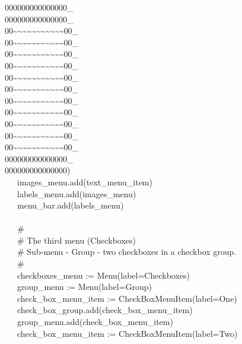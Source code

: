 {000000000000000\_ \\
000000000000000\_ \\
00\~{}\~{}\~{}\~{}\~{}\~{}\~{}\~{}\~{}\~{}\~{}00\_ \\
00\~{}\~{}\~{}\~{}\~{}\~{}\~{}\~{}\~{}\~{}\~{}00\_ \\
00\~{}\~{}\~{}\~{}\~{}\~{}\~{}\~{}\~{}\~{}\~{}00\_ \\
00\~{}\~{}\~{}\~{}\~{}\~{}\~{}\~{}\~{}\~{}\~{}00\_ \\
00\~{}\~{}\~{}\~{}\~{}\~{}\~{}\~{}\~{}\~{}\~{}00\_ \\
00\~{}\~{}\~{}\~{}\~{}\~{}\~{}\~{}\~{}\~{}\~{}00\_ \\
00\~{}\~{}\~{}\~{}\~{}\~{}\~{}\~{}\~{}\~{}\~{}00\_ \\
00\~{}\~{}\~{}\~{}\~{}\~{}\~{}\~{}\~{}\~{}\~{}00\_ \\
00\~{}\~{}\~{}\~{}\~{}\~{}\~{}\~{}\~{}\~{}\~{}00\_ \\
00\~{}\~{}\~{}\~{}\~{}\~{}\~{}\~{}\~{}\~{}\~{}00\_ \\
00\~{}\~{}\~{}\~{}\~{}\~{}\~{}\~{}\~{}\~{}\~{}00\_ \\
000000000000000\_ \\
000000000000000{\textquotedbl}) \\
\>   \ \ \ images\_menu.add(text\_menu\_item) \\
\>   \ \ \ labels\_menu.add(images\_menu) \\
\>   \ \ \ menu\_bar.add(labels\_menu) \\
\ \\
\>   \ \ \ \# \\
\>   \ \ \ \# The third menu
({\textquotedbl}Checkboxes{\textquotedbl}) \\
\>   \ \ \ \# Sub-menu - {\textquotedbl}Group{\textquotedbl} - two
checkboxes in a checkbox group. \\
\>   \ \ \ \# \\
\>   \ \ \ checkboxes\_menu :=
Menu({\textquotedbl}label=Checkboxes{\textquotedbl}) \\
\>   \ \ \ group\_menu :=
Menu({\textquotedbl}label=Group{\textquotedbl}) \\
\>   \ \ \ check\_box\_menu\_item :=
CheckBoxMenuItem({\textquotedbl}label=One{\textquotedbl}) \\
\>   \ \ \ check\_box\_group.add(check\_box\_menu\_item) \\
\>   \ \ \ group\_menu.add(check\_box\_menu\_item) \\
\>   \ \ \ check\_box\_menu\_item :=
CheckBoxMenuItem({\textquotedbl}label=Two{\textquotedbl}) \\
}
